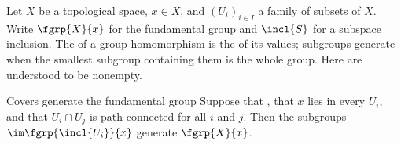Let $X$ be a topological space, $x\in X$, and $(U_i)_{i\in I}$ a family of
subsets of $X$.  Write $\fgrp{X}{x}$ for the
fundamental group and $\incl{S}$ for a subspace inclusion.  The
 of a group homomorphism is the
 of its values; subgroups generate when the
smallest subgroup containing them is the whole group.  Here
 are understood to be
nonempty.

\begin{theorem}[id=5.1]{Covers generate the fundamental group}
Suppose that \hypCoverFamily, that $x$ lies in every $U_{i}$, and that
$U_{i} \cap U_{j}$ is path connected for all $i$ and $j$.  Then the subgroups
$\im \fgrp{\incl{U_{i}}}{x}$ generate $\fgrp{X}{x}$.
\end{theorem}

